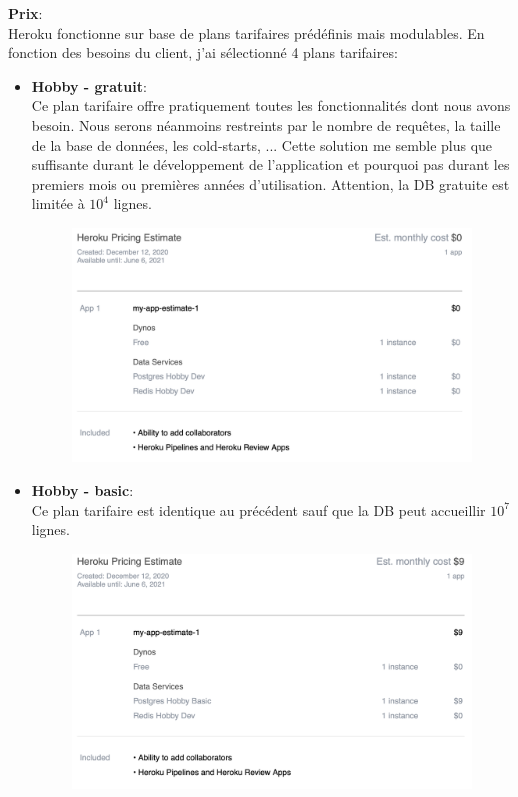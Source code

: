 \newpara
\textbf{Prix}: \\ Heroku fonctionne sur base de plans tarifaires prédéfinis mais modulables. En fonction des besoins du client, j'ai sélectionné 4 plans tarifaires:
\begin{itemize}
  \newpage
  \item \textbf{Hobby - gratuit}: \\ Ce plan tarifaire offre pratiquement toutes les fonctionnalités dont nous avons besoin. Nous serons néanmoins restreints par le nombre de requêtes, la taille de la base de données, les cold-starts, ... Cette solution me semble plus que suffisante durant le développement de l'application et pourquoi pas durant les premiers mois ou premières années d'utilisation. Attention, la DB gratuite est limitée à $10^4$ lignes.
  \begin{figure}[H]
    \centering
    \includegraphics[width=0.75\linewidth]{img/heroku/Heroku_free.png}
  \end{figure}

  \item \textbf{Hobby - basic}: \\ Ce plan tarifaire est identique au précédent sauf que la DB peut accueillir $10^7$ lignes.
  \begin{figure}[H]
    \centering
    \includegraphics[width=0.75\linewidth]{img/heroku/Heroku_basic.png}
  \end{figure}
  

\end{itemize}
